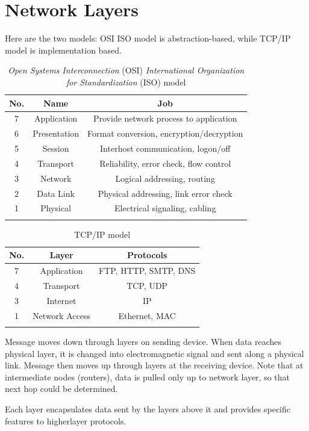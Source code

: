 \documentclass[a4paper, 12pt]{book} %
\begin{document}
\chapter{Network Layers}
Here are the two models: OSI ISO model is abstraction-based, while TCP/IP model is implementation based.
\begin{longtable}{|c|c|c|} \hline 
    
    No. & Name & Job \\ \hline 
   7 & Application & Provide network process to application \\ \hline 
   6 & Presentation & Format conversion, encryption/decryption \\ \hline 
   5 & Session & Interhost communication, logon/off \\ \hline 
   4 &  Transport & Reliability, error check, flow control \\ \hline 
   3 &  Network & Logical addressing, routing \\ \hline 
   2 & Data Link & Physical addressing, link error check \\ \hline 
   1 &  Physical & Electrical signaling, cabling \\ \hline   
   \caption{\emph{Open Systems Interconnection} (OSI)  \emph{International Organization for Standardization} (ISO) model}      
\end{longtable}

\begin{longtable}{|c|c|c|} \hline 
    No. & Layer & Protocols \\ \hline 
    7 & Application & FTP, HTTP, SMTP, DNS \\ \hline 
    4 & Transport & TCP, UDP \\ \hline 
    3 & Internet & IP \\ \hline 
    1 & Network Access & Ethernet, MAC \\ \hline 
    \caption{TCP/IP model}
\end{longtable}

Message moves down through layers on sending device. When data reaches physical layer, it is changed into electromagnetic signal and sent along a physical link. Message then moves up through layers at the receiving device. Note that at intermediate nodes (routers), data is pulled only up to network layer, so that next hop could be determined.

Each layer encapsulates data sent by the layers above it and provides specific features to higherlayer protocols.
\end{document}
